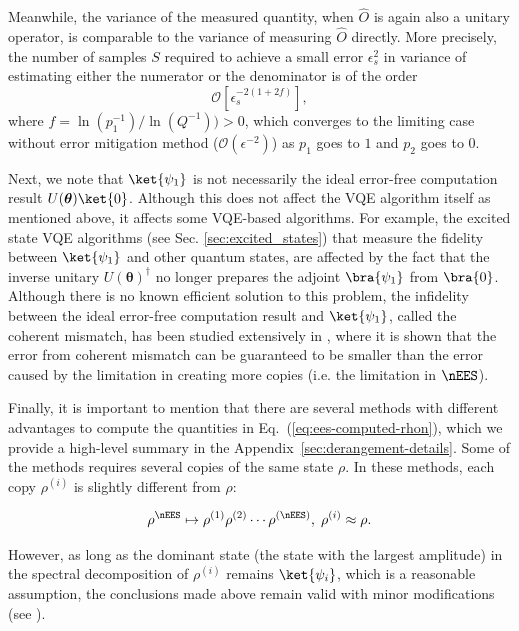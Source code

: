 Meanwhile, the variance of the measured quantity, when $\hat{O}$ is again also a unitary
operator, is comparable to the variance of measuring $\hat{O}$ directly. More precisely,
the number of samples $S$ required to achieve a small error $\epsilon_s^2$ in variance of estimating either the numerator or the denominator is of the order~\cite{koczorExponentialErrorSuppression2021}
\begin{equation}\label{eq:ees-variance}
    \mathcal{O}[\epsilon ^{-2(1+2f)}_{s}],
\end{equation}
where $f=\ln(p_1^{-1})/\ln(Q^{-1}))>0$, which converges to the limiting case without error mitigation method ($\mathcal{O}(\epsilon^{-2})$) as $p_1$ goes to $1$ and $p_2$ goes to $0$.

Next, we note that $\ket{\psi_1}$ is not necessarily the ideal error-free computation result $U(\boldsymbol{\theta})\ket{0}$.
Although this does not affect the VQE algorithm itself as mentioned above, 
it affects some VQE-based algorithms. 
For example, the excited state VQE algorithms (see Sec. \ref{sec:excited_states}) that measure the fidelity between 
$\ket{\psi_1}$ and other quantum states, are affected by the fact that
the inverse unitary $U(\boldsymbol{\theta})^\dagger$ no longer prepares the adjoint $\bra{\psi_1}$ from $\bra{0}$.
Although there is no known efficient solution to this problem, the infidelity between the ideal error-free computation result and $\ket{\psi_1}$, called the coherent mismatch, has been studied extensively in \citet{koczorDominantEigenvectorNoisy2021},
where it is shown that the error from coherent mismatch can be guaranteed to be smaller than the
error caused by the limitation in creating more copies (i.e. the limitation in $\nEES$).

Finally, it is important to mention that there are several methods with different advantages to compute the quantities in Eq.~(\ref{eq:ees-computed-rhon}), which we provide a high-level summary in the Appendix~\ref{sec:derangement-details}. Some of the methods requires several copies of the same state $\rho$. 
In these methods, each copy $\rho^{(i)}$ is slightly different from $\rho$:

\begin{equation}
    \rho^\nEES \mapsto \rho^{(1)} \rho^{(2)} \cdots \rho^{(\nEES)},\;\rho^{(i)} \approx \rho.
\end{equation}

However, as long as the dominant state (the state with the largest amplitude) in the spectral decomposition of $\rho^{(i)}$ remains $\ket{\psi_i}$, which is a reasonable assumption, the conclusions made above remain valid with minor modifications (see \citet{koczorExponentialErrorSuppression2021}).

